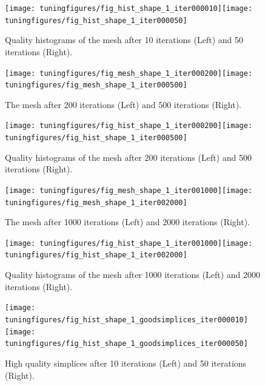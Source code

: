 \documentclass[10pt,a4paper]{book}
\begin{document}
\begin{figure}[tbhp]
\centerline{\texttt{[image: tuningfigures/fig\_hist\_shape\_1\_iter000010]}\hspace{3cm}\texttt{[image: tuningfigures/fig\_hist\_shape\_1\_iter000050]}}
\caption{\label{fig:fig_hist_shape_1_iter000010} Quality histograms of the mesh after 10 iterations (Left) and 50 iterations (Right).}
\end{figure}


\begin{figure}[tbhp]
\centerline{\texttt{[image: tuningfigures/fig\_mesh\_shape\_1\_iter000200]}\hspace{3cm}\texttt{[image: tuningfigures/fig\_mesh\_shape\_1\_iter000500]}}
\caption{\label{fig:fig_mesh_shape_1_iter000200} The mesh after 200 iterations (Left) and 500 iterations (Right).}
\end{figure}

\begin{figure}[tbhp]
\centerline{\texttt{[image: tuningfigures/fig\_hist\_shape\_1\_iter000200]}\hspace{3cm}\texttt{[image: tuningfigures/fig\_hist\_shape\_1\_iter000500]}}
\caption{\label{fig:fig_hist_shape_1_iter000200} Quality histograms of the mesh after 200 iterations (Left) and 500 iterations (Right).}
\end{figure}

\begin{figure}[tbhp]
\centerline{\texttt{[image: tuningfigures/fig\_mesh\_shape\_1\_iter001000]}\hspace{3cm}\texttt{[image: tuningfigures/fig\_mesh\_shape\_1\_iter002000]}}
\caption{\label{fig:fig_mesh_shape_1_iter001000} The mesh after 1000 iterations (Left) and 2000 iterations (Right).}
\end{figure}

\begin{figure}[tbhp]
\centerline{\texttt{[image: tuningfigures/fig\_hist\_shape\_1\_iter001000]}\hspace{3cm}\texttt{[image: tuningfigures/fig\_hist\_shape\_1\_iter002000]}}
\caption{\label{fig:fig_hist_shape_1_iter001000} Quality histograms of the mesh after 1000 iterations (Left) and 2000 iterations (Right).}
\end{figure}

\begin{figure}[tbhp]
\centerline{\texttt{[image: tuningfigures/fig\_hist\_shape\_1\_goodsimplices\_iter000010]}\hspace{3cm}\texttt{[image: tuningfigures/fig\_hist\_shape\_1\_goodsimplices\_iter000050]}}
\caption{\label{fig:fig_hist_shape_1_goodsimplices_iter000010} High quality simplices after 10 iterations (Left) and 50 iterations (Right).}
\end{figure}
\end{document}

